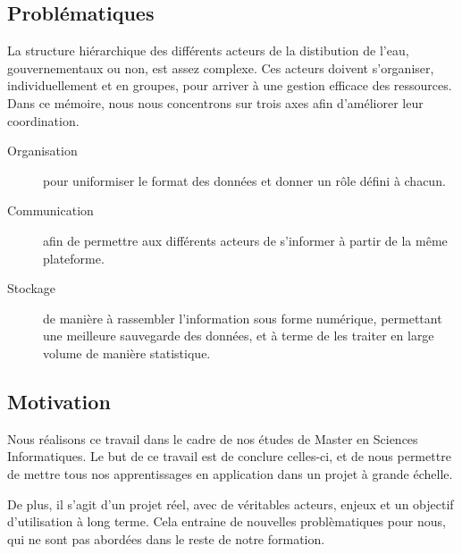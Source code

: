 \documentclass{eplmastersthesis_FR}
\begin{document}

		\subsection*{Problématiques}
			La structure hiérarchique des différents acteurs de la distibution de l'eau, gouvernementaux ou non, est assez complexe. Ces acteurs doivent s'organiser, individuellement et en groupes, pour arriver à une gestion efficace des ressources. Dans ce mémoire, nous nous concentrons sur trois axes afin d'améliorer leur coordination.

			\begin{description}
				\item[Organisation] pour uniformiser le format des données et donner un rôle défini à chacun.
				\item[Communication] afin de permettre aux différents acteurs de s'informer à partir de la même plateforme.
				\item[Stockage] de manière à rassembler l'information sous forme numérique, permettant une meilleure sauvegarde des données, et à terme de les traiter en large volume de manière statistique.
			\end{description}


		\subsection*{Motivation}

			Nous réalisons ce travail dans le cadre de nos études de Master en Sciences Informatiques. Le but de ce travail est de conclure celles-ci, et de nous permettre de mettre tous nos apprentissages en application dans un projet à grande échelle.

			De plus, il s'agit d'un projet réel, avec de véritables acteurs, enjeux et un objectif d'utilisation à long terme. Cela entraine de nouvelles problèmatiques pour nous, qui ne sont pas abordées dans le reste de notre formation.
\end{document}
